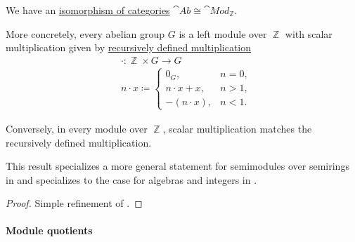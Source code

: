 \begin{proposition}\label{thm:abelian_group_is_module}
  We have an \hyperref[rem:category_similarity/isomorphism]{isomorphism of categories} \( \hyperref[def:abelian_group]{\cat{Ab}} \cong \hyperref[def:module]{\cat{Mod}_\BbbZ} \).

  More concretely, every abelian group \( G \) is a left module over \( \BbbZ \) with scalar multiplication given by \hyperref[rem:additive_semigroup/multiplication]{recursively defined multiplication}
  \begin{equation}\label{eq:thm:abelian_group_is_module/operation}
    \begin{aligned}
      &\cdot: \BbbZ \times G \to G \\
      &n \cdot x \coloneqq \begin{cases}
        0_G,           &n = 0, \\
        n \cdot x + x, &n > 1, \\
        -(n \cdot x),  &n < 1.
      \end{cases}
    \end{aligned}
  \end{equation}

  Conversely, in every module over \( \BbbZ \), scalar multiplication matches the recursively defined multiplication.
\end{proposition}
\begin{comments}
  \item This result specializes a more general statement for semimodules over semirings in  and specializes to the case for algebras and integers in .
\end{comments}
\begin{proof}
  Simple refinement of .
\end{proof}

\paragraph{Module quotients}

